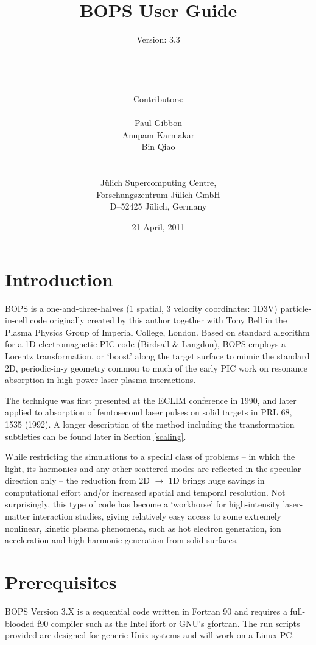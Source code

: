 \documentclass[11pt]{article}
\title{\bf BOPS User Guide\\}
\author{ Version: 3.3 \\ \date{21 April, 2011}
\\ \\ \\
Contributors: \\ \\
Paul Gibbon \\
Anupam Karmakar \\
Bin Qiao \\ \\ \\
J\"ulich Supercomputing Centre,\\
Forschungszentrum J\"ulich GmbH \\
D--52425 J\"ulich, Germany
}
\begin{document}
\maketitle
\pagebreak

\begin{tableofcontents}

\end{tableofcontents}

\pagebreak

\section{Introduction}

BOPS is a one-and-three-halves (1 spatial, 3 velocity coordinates: 1D3V) particle-in-cell code originally created by this author together with Tony Bell in the Plasma Physics Group of Imperial College, London. Based on standard algorithm for a 1D electromagnetic PIC code (Birdsall \& Langdon), BOPS employs a Lorentz transformation, or `boost' along the target surface to mimic the standard 2D, periodic-in-y geometry common to much of the early PIC work on resonance absorption in high-power laser-plasma interactions. 

The technique was first presented at the ECLIM conference in 1990, and later applied to absorption of femtosecond laser pulses on solid targets in PRL 68, 1535 (1992). A longer description of the method including the transformation subtleties can be found later in Section \ref{scaling}.

 While restricting the simulations to a special class of problems -- in which the light, its harmonics and any other scattered modes are reflected in the specular direction only -- the reduction from 2D $\rightarrow$ 1D brings huge savings in computational effort and/or increased spatial and temporal resolution. Not surprisingly, this type of code has become a `workhorse' for high-intensity laser-matter interaction studies, giving relatively easy access to some extremely nonlinear, kinetic plasma phenomena, such as hot electron generation, ion acceleration and high-harmonic generation from solid surfaces.


\section{Prerequisites}

BOPS Version 3.X is a sequential code written in Fortran 90 and requires a full-blooded f90 compiler such as the Intel ifort or GNU's gfortran.  The run scripts provided are designed for generic Unix systems and will work on a Linux PC. 
\end{document}
